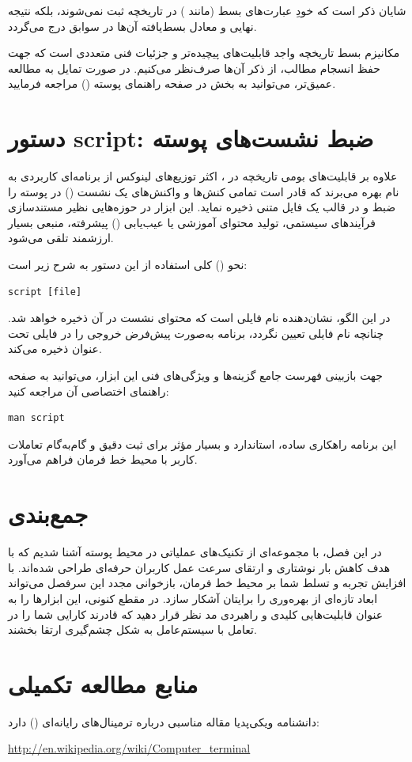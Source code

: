 شایان ذکر است که خودِ عبارت‌های بسط (مانند \cmd{!!}) در تاریخچه ثبت نمی‌شوند، بلکه نتیجه نهایی و معادل بسط‌یافته آن‌ها در سوابق درج می‌گردد.

مکانیزم بسط تاریخچه واجد قابلیت‌های پیچیده‌تر و جزئیات فنی متعددی است که جهت حفظ انسجام مطالب، از ذکر آن‌ها صرف‌نظر می‌کنیم. در صورت تمایل به مطالعه عمیق‌تر، می‌توانید به بخش  در صفحه راهنمای پوسته () مراجعه فرمایید.

\section{دستور script: ضبط نشست‌های پوسته}

علاوه بر قابلیت‌های بومی تاریخچه در ، اکثر توزیع‌های لینوکس از برنامه‌ای کاربردی به نام  بهره می‌برند که قادر است تمامی کنش‌ها و واکنش‌های یک نشست () در پوسته را ضبط و در قالب یک فایل متنی ذخیره نماید. این ابزار در حوزه‌هایی نظیر مستندسازی فرآیندهای سیستمی، تولید محتوای آموزشی یا عیب‌یابی () پیشرفته، منبعی بسیار ارزشمند تلقی می‌شود.

نحو () کلی استفاده از این دستور به شرح زیر است:

\begin{latin}
\begin{lstlisting}
script [file]
\end{lstlisting}
\end{latin}

در این الگو، \file{[file]} نشان‌دهنده نام فایلی است که محتوای نشست در آن ذخیره خواهد شد. چنانچه نام فایلی تعیین نگردد، برنامه به‌صورت پیش‌فرض خروجی را در فایلی تحت عنوان  ذخیره می‌کند.

جهت بازبینی فهرست جامع گزینه‌ها و ویژگی‌های فنی این ابزار، می‌توانید به صفحه راهنمای اختصاصی آن مراجعه کنید:

\begin{latin}
\begin{lstlisting}
man script
\end{lstlisting}
\end{latin}

این برنامه راهکاری ساده، استاندارد و بسیار مؤثر برای ثبت دقیق و گام‌به‌گام تعاملات کاربر با محیط خط فرمان فراهم می‌آورد.

\section{جمع‌بندی}

در این فصل، با مجموعه‌ای از تکنیک‌های عملیاتی در محیط پوسته آشنا شدیم که با هدف کاهش بار نوشتاری و ارتقای سرعت عمل کاربران حرفه‌ای طراحی شده‌اند. با افزایش تجربه و تسلط شما بر محیط خط فرمان، بازخوانی مجدد این سرفصل می‌تواند ابعاد تازه‌ای از بهره‌وری را برایتان آشکار سازد. در مقطع کنونی، این ابزارها را به عنوان قابلیت‌هایی کلیدی و راهبردی مد نظر قرار دهید که قادرند کارایی شما را در تعامل با سیستم‌عامل به شکل چشم‌گیری ارتقا بخشند.

\section{منابع مطالعه تکمیلی}

دانشنامه ویکی‌پدیا مقاله مناسبی درباره ترمینال‌های رایانه‌ای () دارد:

\begin{latin}
\url{http://en.wikipedia.org/wiki/Computer_terminal}
\end{latin}
